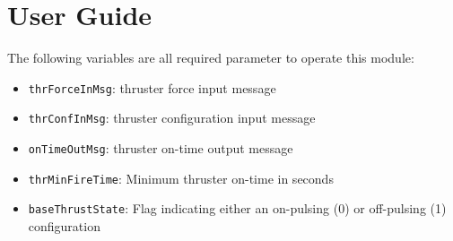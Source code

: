
\section{User Guide}
The following variables are all required parameter to operate this module:
\begin{itemize}
	\item {\tt thrForceInMsg}:  thruster force input message
	\item {\tt thrConfInMsg}:   thruster configuration input message
	\item {\tt onTimeOutMsg}:  thruster on-time output message
	\item {\tt thrMinFireTime}:  Minimum thruster on-time in seconds
	\item {\tt baseThrustState}:  Flag indicating either an on-pulsing (0) or off-pulsing (1) configuration
\end{itemize}
